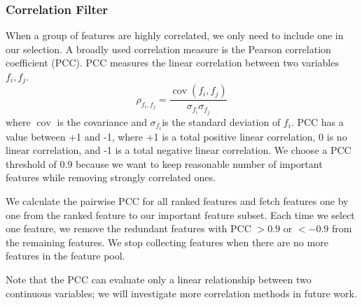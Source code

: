 \subsubsection{Correlation Filter}
When a group of features are highly correlated, we only need to include one in our selection. A broadly used correlation measure is the Pearson correlation coefficient (PCC). PCC measures the linear correlation between two variables $f_{i}, f_{j}$. 
\begin{equation}
\rho_{f_{i}, f_{j}}=\frac{\operatorname{cov}(f_{i}, f_{j})}{\sigma_{f_{i}} \sigma_{f_{j}}}
\end{equation}
where $\operatorname{cov}$ is the covariance and $\sigma_{f_{i}}$is the standard deviation of $f_{i}$.
PCC has a value between +1 and -1, where +1 is a total positive linear correlation, 0 is no linear correlation, and -1 is a total negative linear correlation. We choose a PCC threshold of 0.9 because we want to keep reasonable number of important features while removing strongly correlated ones.  

We calculate the pairwise PCC for all ranked features and fetch features one by one from the ranked feature to our important feature subset. Each time we select one feature, we remove the redundant features with PCC $> 0.9$ or $< -0.9$ from the remaining features. We stop collecting features when there are no more features in the feature pool. %

Note that the PCC can evaluate only a linear relationship between two continuous variables; we will investigate more correlation methods in future work.
